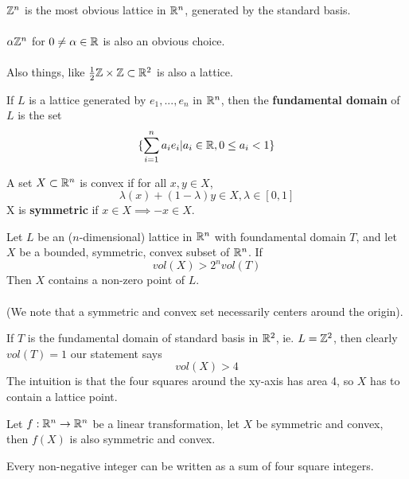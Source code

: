 \begin{example}
$\mathbb{Z}^n$ is the most obvious lattice in $\mathbb{R}^n$, generated by the standard basis.\\\\
$\alpha \mathbb{Z}^n$ for $0 \neq \alpha \in \mathbb{R}$ is also an obvious choice.\\\\
Also things, like $\frac{1}{2} \mathbb{Z} \times \mathbb{Z} \subset \mathbb{R}^2$ is also a lattice.
\end{example}

\begin{definition}
If $L$ is a lattice generated by $e_1, ..., e_n$ in $\mathbb{R}^n$, then the \textbf{fundamental domain} of $L$ is the set
\[\{\sum_{i = 1}^n a_i e_i | a_i \in \mathbb{R}, 0 \leq a_i < 1\}\]
\end{definition}

\begin{definition}
A set $X \subset \mathbb{R}^n$ is convex if for all $x, y \in X$, 
\[\lambda(x) + (1 - \lambda)y \in X, \lambda \in [0, 1]\]
X is \textbf{symmetric} if $x \in X \implies -x \in X$.
\end{definition}

\begin{theorem}[Minkowski, pg. 140 of S + T]
Let $L$ be an ($n$-dimensional) lattice in $\mathbb{R}^n$ with foundamental domain $T$, and let $X$ be a bounded, symmetric, convex subset of $\mathbb{R}^n$. If
\[vol(X) > 2^n vol(T)\]
Then $X$ contains a non-zero point of $L$.\\\\
(We note that a symmetric and convex set necessarily centers around the origin).
\end{theorem}

\begin{remark}
If $T$ is the fundamental domain of standard basis in $\mathbb{R}^2$, ie. $L = \mathbb{Z}^2$, then clearly $vol(T) = 1$ our statement says
\[vol(X) > 4\]
The intuition is that the four squares around the xy-axis has area 4, so $X$ has to contain a lattice point.
\end{remark}

\begin{lemma}
Let $f: \mathbb{R}^n \to \mathbb{R}^n$ be a linear transformation, let $X$ be symmetric and convex, then $f(X)$ is also symmetric and convex.
\end{lemma}

\begin{theorem}
Every non-negative integer can be written as a sum of four square integers.
\end{theorem}

